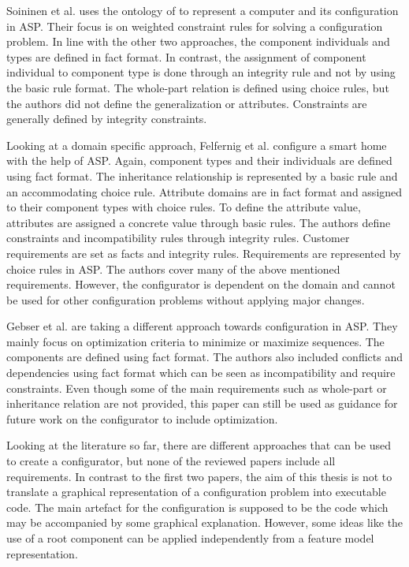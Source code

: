 Soininen et al. \cite{sonitisu01a} uses the ontology of \cite{sotimasu98a} to represent a computer and its configuration in ASP. Their focus is on weighted constraint rules for solving a configuration problem. In line with the other two approaches, the component individuals and types are defined in fact format. In contrast, the assignment of component individual to component type is done through an integrity rule and not by using the basic rule format. The whole-part relation is defined using choice rules, but the authors did not define the generalization or attributes. Constraints are generally defined by integrity constraints.\newline

Looking at a domain specific approach, Felfernig et al. \cite{fefaateruraz17a} configure a smart home with the help of ASP. Again, component types and their individuals are defined using fact format. The inheritance relationship is represented by a basic rule and an accommodating choice rule. Attribute domains are in fact format and assigned to their component types with choice rules. To define the attribute value, attributes are assigned a concrete value through basic rules. The authors define constraints and incompatibility rules through integrity rules. Customer requirements are set as facts and integrity rules. Requirements are represented by choice rules in ASP. The authors cover many of the above mentioned requirements. However, the configurator is dependent on the domain and cannot be used for other configuration problems without applying major changes.\newline

Gebser et al. \cite{gekakasc11d} are taking a different approach towards configuration in ASP. They mainly focus on optimization criteria to minimize or maximize sequences. The components are defined using fact format. The authors also included conflicts and dependencies using fact format which can be seen as incompatibility and require constraints. Even though some of the main requirements such as whole-part or inheritance relation are not provided, this paper can still be used as guidance for future work on the configurator to include optimization. \newline 

Looking at the literature so far, there are different approaches that can be used to create a configurator, but none of the reviewed papers include all requirements. In contrast to the first two papers, the aim of this thesis is not to translate a graphical representation of a configuration problem into executable code. The main artefact for the configuration is supposed to be the code which may be accompanied by some graphical explanation. However, some ideas like the use of a root component can be applied independently from a feature model representation. \newline 

